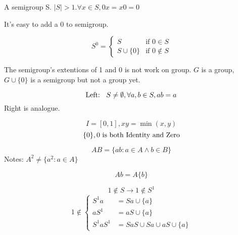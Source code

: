 \begin{Def}
    A semigroup S. $|S| > 1. \forall x \in S, 0x=x0=0$ 
\end{Def}

It's easy to add a 0 to semigroup.

\begin{Exap}

\end{Exap}

\begin{Sym}[$S^{0}$]
    \[
        S^0 =
        \begin{cases}
            S               &   \text{if } 0 \in S  \\
            S \cup \{0\}    &   \text{if } 0 \notin S
        \end{cases}
    \]
\end{Sym}

\begin{Rmk}
    The semigroup's extentions of 1 and 0 is not work on group.
    $G$ is a group, $G \cup \{0\}$ is a semigroup but not a group yet. 
\end{Rmk}

\begin{Def}
    \[
        \text{Left: \space} S \neq \emptyset, \forall a,b \in S, ab=a
    \]
    Right is analogue.
\end{Def}

\begin{Exap}[Semigroups]
    \[
        I=\left[0,1\right],xy=\min(x,y)
    \]   
    \[
        \{0\},0 \text{\space is both Identity and Zero}
    \]
\end{Exap}

\begin{Def}
    \[
        AB=\{ab:a \in A \wedge b \in B\}
    \]    
    Notes: $A^2 \neq \{a^2 : a \in A \} $

    \[
        Ab=A\{b\}
    \]
\end{Def}

\begin{Exap}
    \[
        1 \notin S \rightarrow 1 \notin S^1
    \]
    \[
        1 \notin 
        \begin{cases}
            S^1 a & = Sa \cup \{a\} \\
            a S^1 & = aS \cup \{a\} \\
            S^1 a S^1 & = SaS \cup Sa \cup aS \cup \{a\}
        \end{cases}
    \]
\end{Exap}

